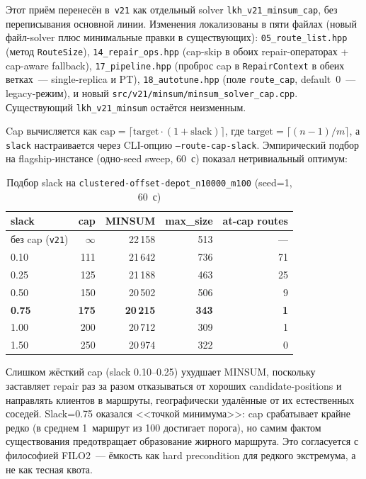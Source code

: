 \documentclass[14pt,a4paper]{extarticle}
\begin{document}
Этот приём перенесён в~\texttt{v21} как отдельный solver \texttt{lkh\_v21\_minsum\_cap}, без переписывания основной линии. Изменения локализованы в пяти файлах (новый файл-solver плюс минимальные правки в существующих): \texttt{05\_route\_list.hpp} (метод \texttt{RouteSize}), \texttt{14\_repair\_ops.hpp} (cap-skip в обоих repair-операторах + cap-aware fallback), \texttt{17\_pipeline.hpp} (проброс cap в \texttt{RepairContext} в обеих ветках~--- single-replica и PT), \texttt{18\_autotune.hpp} (поле \texttt{route\_cap}, default~0~--- legacy-режим), и новый \texttt{src/v21/minsum/minsum\_solver\_cap.cpp}. Существующий \texttt{lkh\_v21\_minsum} остаётся неизменным.

Cap вычисляется как $\mathrm{cap} = \lceil \mathrm{target} \cdot (1 + \mathrm{slack}) \rceil$, где $\mathrm{target} = \lceil(n-1)/m\rceil$, а \texttt{slack} настраивается через CLI-опцию \texttt{--route-cap-slack}. Эмпирический подбор на flagship-инстансе (одно-seed sweep, 60~с) показал нетривиальный оптимум:

\begin{table}[H]
\centering
\caption{Подбор slack на \texttt{clustered-offset-depot\_n10000\_m100} (seed=1, 60~с)}
\small
\begin{tabular}{lrrrr}
\toprule
slack & cap & MINSUM & max\_size & at-cap routes\\
\midrule
без cap (\texttt{v21}) & $\infty$ & 22\,158 & 513 & ---\\
0.10 & 111 & 21\,642 & 736 & 71\\
0.25 & 125 & 21\,188 & 463 & 25\\
0.50 & 150 & 20\,502 & 506 &  9\\
\textbf{0.75} & \textbf{175} & \textbf{20\,215} & \textbf{343} & \textbf{1}\\
1.00 & 200 & 20\,712 & 309 &  1\\
1.50 & 250 & 20\,974 & 322 &  0\\
\bottomrule
\end{tabular}
\normalsize
\end{table}

Слишком жёсткий cap (slack 0.10--0.25) ухудшает MINSUM, поскольку заставляет repair раз за разом отказываться от хороших candidate-positions и направлять клиентов в маршруты, географически удалённые от их естественных соседей. Slack=0.75 оказался <<точкой минимума>>: cap срабатывает крайне редко (в среднем 1~маршрут из 100 достигает порога), но самим фактом существования предотвращает образование жирного маршрута. Это согласуется с философией FILO2~--- ёмкость как hard precondition для редкого экстремума, а не как тесная квота.
\end{document}
